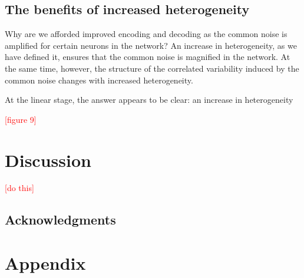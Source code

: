\documentclass[12pt]{article}
\begin{document}
\subsection{The benefits of increased heterogeneity}
	Why are we afforded improved encoding and decoding as the common noise is amplified for certain neurons in the network? An increase in heterogeneity, as we have defined it, ensures that the common noise is magnified in the network. At the same time, however, the structure of the correlated variability induced by the common noise changes with increased heterogeneity. 
	
	At the linear stage, the answer appears to be clear: an increase in heterogeneity
	
\textcolor{red}{[figure 9]}



\section{Discussion}

\textcolor{red}{[do this]}

\subsection*{Acknowledgments}


\section{Appendix}
\end{document}
